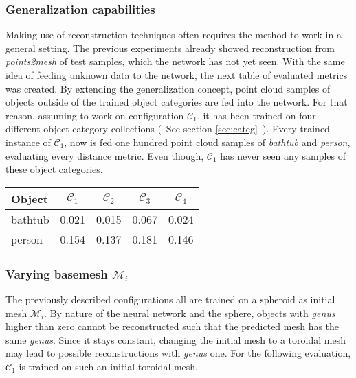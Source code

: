 \subsubsection*{Generalization capabilities}
    Making use of reconstruction techniques often requires the method to work in a general setting.
    The previous experiments already showed reconstruction from \emph{points2mesh} of test samples,
    which the network has not yet seen. With the same idea of feeding unknown data to the network,
    the next table of evaluated metrics was created. By extending the generalization concept, 
    point cloud samples of objects outside of the trained object categories are fed into the network.
    For that reason, assuming to work on configuration $\mathcal{C}_1$, it has been trained on four different
    object category collections (~See section \ref{sec:categ}~).
    Every trained instance of $\mathcal{C}_1$, now is fed one hundred point cloud samples 
    of \emph{bathtub} and \emph{person}, evaluating every distance metric. Even though, $\mathcal{C}_1$ has never seen any samples of these object categories.

\begin{center}
     \label{tab:distance7500} 
    \begin{center}
        \begin{tabular}{| l  | c | c | c | c |}
            \hline
            Object& $\mathcal{C}_1$ & $\mathcal{C}_2$ & $\mathcal{C}_3$ & $\mathcal{C}_4$ \\ \hline
            \multirow{1}{*}{bathtub}&0.021&0.015&0.067&0.024\\\hline
            \multirow{1}{*}{person}&0.154&0.137&0.181&0.146\\\hline
        \end{tabular}
    \end{center}
\end{center}

\subsubsection*{Varying basemesh $\mathcal{M}_i$}
    The previously described configurations all are trained on a spheroid as initial mesh $\mathcal{M}_i$. 
    By nature of the neural network and the sphere, objects with \emph{genus} higher than zero cannot be
    reconstructed such that the predicted mesh has the same \emph{genus}. Since it stays constant, 
    changing the initial mesh to a toroidal mesh may lead to possible reconstructions with \emph{genus} one. 
    For the following evaluation, $\mathcal{C}_{1}$ is trained on such an initial toroidal mesh.

